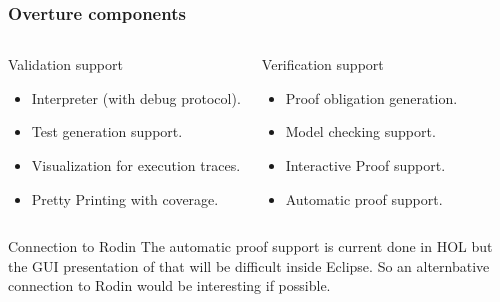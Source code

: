 \documentclass[slidestop,uncompress,mathserif,notes]{beamer}
\begin{document}
\begin{frame}
	\frametitle{Overture components}
	\begin{columns}
			\begin{block}{Validation support}
				{\scriptsize\begin{itemize}
				  \item Interpreter (with debug protocol).
				  \item Test generation support.
				  \item Visualization for execution traces.      
				  \item Pretty Printing with coverage.
				\end{itemize}}
			\end{block}
			\begin{block}{Verification support}
				{\scriptsize\begin{itemize}
				  \item Proof obligation generation.
                                  \item Model checking support.
				  \item Interactive Proof support.
				  \item Automatic proof support.      
				\end{itemize}}
			\end{block}
		\end{columns}

%
%
%
%

\begin{beamerboxesrounded}[upper=uppercol,lower=lowercol,shadow=true]{Connection to Rodin}
The automatic proof support is current done in HOL but the GUI presentation of that will be difficult inside Eclipse. So an alternbative connection to Rodin would be interesting if possible.
\end{beamerboxesrounded}

\end{frame}
\end{document}
